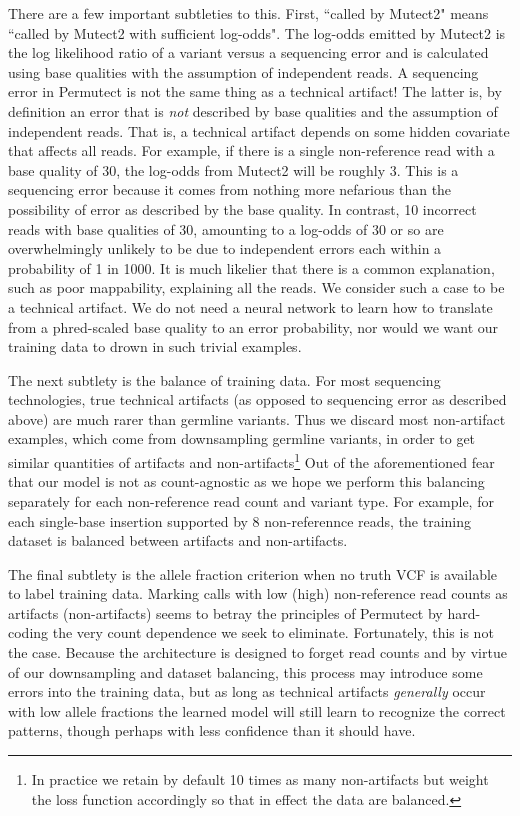 \documentclass[times, twoside, watermark]{StyleBioRxiv}
\begin{document}
There are a few important subtleties to this.  First, ``called by Mutect2" means ``called by Mutect2 with sufficient log-odds".  The log-odds emitted by Mutect2 is the log likelihood ratio of a variant versus a sequencing error and is calculated using base qualities with the assumption of independent reads.  A sequencing error in Permutect is not the same thing as a technical artifact!  The latter is, by definition an error that is \textit{not} described by base qualities and the assumption of independent reads.  That is, a technical artifact depends on some hidden covariate that affects all reads.  For example, if there is a single non-reference read with a base quality of 30, the log-odds from Mutect2 will be roughly 3.  This is a sequencing error because it comes from nothing more nefarious than the possibility of error as described by the base quality.  In contrast, 10 incorrect reads with base qualities of 30, amounting to a log-odds of 30 or so are overwhelmingly unlikely to be due to independent errors each within a probability of 1 in 1000.  It is much likelier that there is a common explanation, such as poor mappability, explaining all the reads.  We consider such a case to be a technical artifact.  We do not need a neural network to learn how to translate from a phred-scaled base quality to an error probability, nor would we want our training data to drown in such trivial examples.

The next subtlety is the balance of training data.  For most sequencing technologies, true technical artifacts (as opposed to sequencing error as described above) are much rarer than germline variants.  Thus we discard most non-artifact examples, which come from downsampling germline variants, in order to get similar quantities of artifacts and non-artifacts\footnote{In practice we retain by default 10 times as many non-artifacts but weight the loss function accordingly so that in effect the data are balanced.}  Out of the aforementioned fear that our model is not as count-agnostic as we hope we perform this balancing separately for each non-reference read count and variant type.  For example, for each single-base insertion supported by 8 non-referennce reads, the training dataset is balanced between artifacts and non-artifacts.

The final subtlety is the allele fraction criterion when no truth VCF is available to label training data.  Marking calls with low (high) non-reference read counts as artifacts (non-artifacts) seems to betray the principles of Permutect by hard-coding the very count dependence we seek to eliminate.  Fortunately, this is not the case.  Because the architecture is designed to forget read counts and by virtue of our downsampling and dataset balancing, this process may introduce some errors into the training data, but as long as technical artifacts \textit{generally} occur with low allele fractions the learned model will still learn to recognize the correct patterns, though perhaps with less confidence than it should have.
\end{document}
